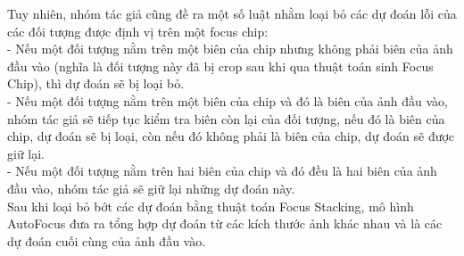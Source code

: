 {    \noindent
    Tuy nhiên, nhóm tác giả cũng đề ra một số luật nhằm loại bỏ các dự đoán lỗi của các đối tượng được định vị trên một focus chip: \\
    - Nếu một đối tượng nằm trên một biên của chip nhưng không phải biên của ảnh đầu vào (nghĩa là đối tượng này đã bị crop sau khi qua thuật toán sinh Focus Chip), thì dự đoán sẽ bị loại bỏ. \\
    - Nếu một đối tượng nằm trên một biên của chip và đó là biên của ảnh đầu vào, nhóm tác giả sẽ tiếp tục kiểm tra biên còn lại của đối tượng, nếu đó là biên của chip, dự đoán sẽ bị loại, còn nếu đó không phải là biên của chip, dự đoán sẽ được giữ lại. \\
    - Nếu một đối tượng nằm trên hai biên của chip và đó đều là hai biên của ảnh đầu vào, nhóm tác giả sẽ giữ lại những dự đoán này. \\
    Sau khi loại bỏ bớt các dự đoán bằng thuật toán Focus Stacking, mô hình AutoFocus đưa ra tổng hợp dự đoán từ các kích thước ảnh khác nhau và là các dự đoán cuối cùng của ảnh đầu vào.
}